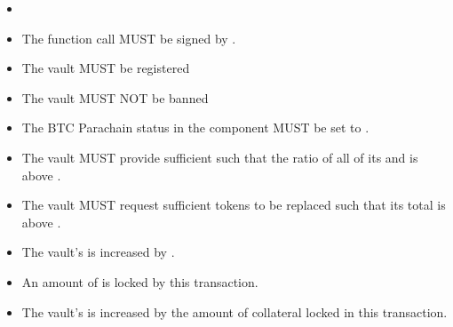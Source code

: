 \documentclass[a4paper,10pt,english]{sphinxmanual}
\begin{document}
\begin{itemize}
\item {} 

\end{itemize}

\begin{itemize}
\item {} 
The function call MUST be signed by .

\item {} 
The vault MUST be registered

\item {} 
The vault MUST NOT be banned

\item {} 
The BTC Parachain status in the {\hyperref[\detokenize{spec/security:security}]{}} component MUST be set to .

\item {} 
The vault MUST provide sufficient  such that the ratio of all of its  and  is above {\hyperref[\detokenize{spec/fee:replacegriefingcollateral}]{}}.

\item {} 
The vault MUST request sufficient tokens to be replaced such that its total is above .

\end{itemize}

\begin{itemize}
\item {} 
The vault’s  is increased by .

\item {} 
An amount of  is locked by this transaction.

\item {} 
The vault’s  is increased by the amount of collateral locked in this transaction.

\end{itemize}
\end{document}
